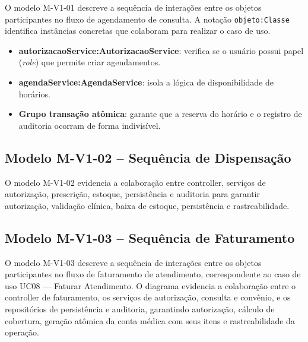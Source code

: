 O modelo M-V1-01 descreve a sequência de interações entre os objetos participantes no fluxo de agendamento de consulta. A notação \texttt{objeto:Classe} identifica instâncias concretas que colaboram para realizar o caso de uso.

\begin{itemize}
    \item \textbf{autorizacaoService:AutorizacaoService}: verifica se o usuário possui papel (\textit{role}) que permite criar agendamentos.
    \item \textbf{agendaService:AgendaService}: isola a lógica de disponibilidade de horários.
    \item \textbf{Grupo transação atômica}: garante que a reserva do horário e o registro de auditoria ocorram de forma indivisível.
\end{itemize}

\subsection{Modelo M-V1-02 -- Sequência de Dispensação}

O modelo M-V1-02 evidencia a colaboração entre controller, serviços de autorização, prescrição, estoque, persistência e auditoria para garantir autorização, validação clínica, baixa de estoque, persistência e rastreabilidade.

\subsection{Modelo M-V1-03 -- Sequência de Faturamento}

O modelo M-V1-03 descreve a sequência de interações entre os objetos participantes no fluxo de faturamento de atendimento, correspondente ao caso de uso UC08 — Faturar Atendimento. O diagrama evidencia a colaboração entre o controller de faturamento, os serviços de autorização, consulta e convênio, e os repositórios de persistência e auditoria, garantindo autorização, cálculo de cobertura, geração atômica da conta médica com seus itens e rastreabilidade da operação.

